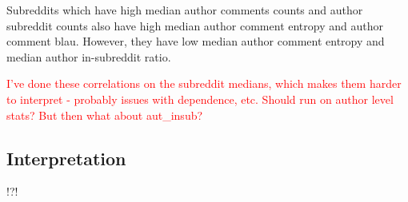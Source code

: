 Subreddits which have high median author comments counts and author subreddit counts also have high median author comment entropy and author comment blau. However, they have low median author comment entropy and median author in-subreddit ratio. 

\textcolor{red}{I've done these correlations on the subreddit medians, which makes them harder to interpret - probably issues with dependence, etc. Should run on author level stats? But then what about aut\_insub?}


\subsection{Interpretation}
!?!
